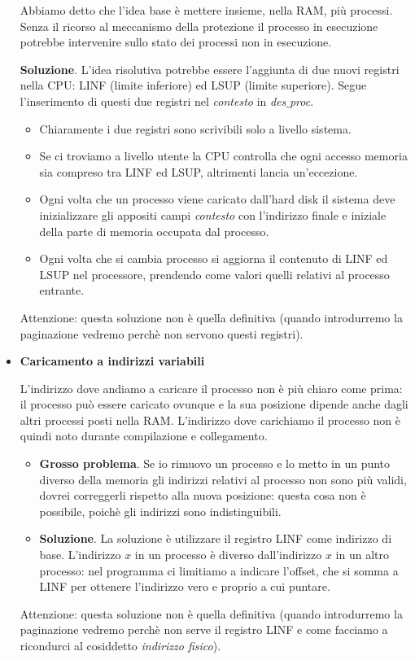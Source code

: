 \documentclass[11pt]{report}
\theoremstyle{definition}
\begin{document}
\begin{itemize}
	Abbiamo detto che l'idea base è mettere insieme, nella RAM, più processi. Senza il ricorso al meccanismo della protezione il processo in esecuzione potrebbe intervenire sullo stato dei processi non in esecuzione.
	
	\noindent \textbf{Soluzione}. L'idea risolutiva potrebbe essere l'aggiunta di due nuovi registri nella CPU: LINF (limite inferiore) ed LSUP (limite superiore). Segue l'inserimento di questi due registri nel \emph{contesto} in \emph{des$\_$proc}. \begin{itemize} 
		\item Chiaramente i due registri sono scrivibili solo a livello sistema.
		\item Se ci troviamo a livello utente la CPU controlla che ogni accesso memoria sia compreso tra LINF ed LSUP, altrimenti lancia un'eccezione.
		\item Ogni volta che un processo viene caricato dall'hard disk il sistema deve inizializzare gli appositi campi \emph{contesto} con l'indirizzo finale e iniziale della parte di memoria occupata dal processo.
		\item Ogni volta che si cambia processo si aggiorna il contenuto di LINF ed LSUP nel processore, prendendo come valori quelli relativi al processo entrante.
	\end{itemize}  
	Attenzione: questa soluzione non è quella definitiva (quando introdurremo la paginazione vedremo perchè non servono questi registri).
	
	\item \textbf{Caricamento a indirizzi variabili}
	
	L'indirizzo dove andiamo a caricare il processo non è più chiaro come prima: il processo può essere caricato ovunque e la sua posizione dipende anche dagli altri processi posti nella RAM. L'indirizzo dove carichiamo il processo non è quindi noto durante compilazione e collegamento.
	\begin{itemize}
		\item \textbf{Grosso problema}. Se io rimuovo un processo e lo metto in un punto diverso della memoria gli indirizzi relativi al processo non sono più validi, dovrei correggerli rispetto alla nuova posizione: questa cosa non è possibile, poichè gli indirizzi sono indistinguibili.
		\item \textbf{Soluzione}. La soluzione è utilizzare il registro LINF come indirizzo di base. L'indirizzo $x$ in un processo è diverso dall'indirizzo $x$ in un altro processo: nel programma ci limitiamo a indicare l'offset, che si somma a LINF per ottenere l'indirizzo vero e proprio a cui puntare. 
	\end{itemize}
	Attenzione: questa soluzione non è quella definitiva (quando introdurremo la paginazione vedremo perchè non serve il registro LINF e come facciamo a ricondurci al cosiddetto \emph{indirizzo fisico}).
\end{itemize}
\end{document}
